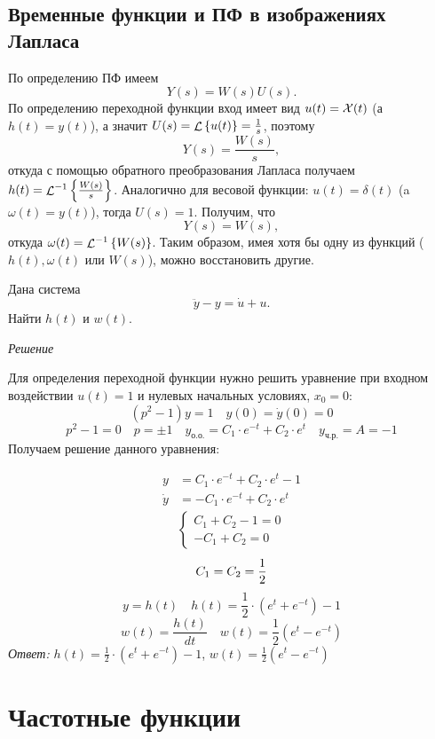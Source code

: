 \documentclass[../../TAU.tex]{subfiles}
\begin{document}
\subsection{Временные функции и ПФ в изображениях Лапласа }

    По определению ПФ имеем
    $$
        Y(s) = W(s)U(s).
    $$
    По определению переходной функции вход имеет вид 
    ${u(t) = \mathcal{X}(t)}$ 
    (а~${h(t) = y(t)}$), а значит 
    ${U(s) = \mathop{\mathcal{L}}\nolimits\left\{u(t)\right\} = \frac{1}{s}}$, поэтому
    $$
        Y(s) = \frac{W(s)}{s},
    $$
    откуда с помощью обратного преобразования Лапласа получаем 
    ${h(t) = {\mathop{\mathcal{L}}\nolimits^{-1}\left\{\frac{W(s)}{s}\right\}}}$.
    Аналогично для весовой функции: 
    ${u(t) = \delta(t)}$ 
    (a ${\omega(t) = y(t)}$), тогда ${U(s)=1}$. Получим, что
    $$
        Y(s) = W(s),
    $$
    откуда 
    ${\omega(t) = {\mathop{\mathcal{L}}\nolimits^{-1}\left\{W(s)\right\}}}$.
    Таким образом, имея хотя бы одну из функций ($h(t), \omega(t)$ или $W(s)$), можно восстановить другие.

    \examp Дана система
    $$
        \ddot y - y = \dot u + u.
    $$
    Найти $h(t)$ и $w(t)$.

    \textit{Решение}

    Для определения переходной функции нужно решить уравнение при входном воздействии ${u(t)=1}$ и нулевых начальных условиях, ${x_0 = 0}$:
    $$
        (p^2-1)y=1\quad y(0)=\dot y(0)=0
    $$
    $$
        p^2-1=0\quad p=\pm1\quad y_\text{о.о.}=C_1\cdot e^{-t}+C_2\cdot e^t\quad y_\text{ч.р.}=A=-1
    $$
    Получаем решение данного уравнения:

    \begin{align*}
        y &= C_1\cdot e^{-t}+C_2\cdot e^t-1     \\
        \dot y &= -C_1\cdot e^{-t}+C_2\cdot e^t
    \end{align*}
    \begin{align*}
        \begin{cases}
          C_1+C_2-1 = 0\\
         -C_1+C_2   = 0
        \end{cases}
    \end{align*}
    \[
        C_1=C_2={1\over2}
    \]
    \[
        y=h(t) \quad h(t)=\frac{1}{2}\cdot(e^t+e^{-t})-1
    \]
    \[
        w(t)=\frac{h(t)}{dt} \quad w(t)=\frac{1}{2}(e^t-e^{-t})
    \]
    \textit{Ответ:}
    ${h(t)=\frac{1}{2}\cdot(e^t+e^{-t})-1}$, ${w(t)=\frac{1}{2}(e^t-e^{-t})}$

\section{Частотные функции}
\end{document}
